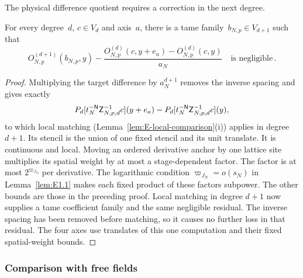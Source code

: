 The physical difference quotient requires a correction in the next degree.
\begin{lemma}\label{lem:E2.9}
For every degree~$d$, $c\in V_d$ and axis~$a$, there is a tame family~$b_{N,p}\in V_{d+1}$ such that
\begin{equation*}
O^{(d+1)}_{N,p}(b_{N,p},y)
-\frac{O^{(d)}_{N,p}(c,y+e_a)-O^{(d)}_{N,p}(c,y)}{a_N}
\quad\text{is negligible}\,.
\end{equation*}
\end{lemma}
\begin{proof}
Multiplying the target difference by $a_N^{d+1}$ removes the inverse spacing and gives exactly
\begin{equation*}
P_d[t_N^{-\mathsf{N}}\mathsf Z_{N,p,d}^{-1}c](y+e_a)
-P_d[t_N^{-\mathsf{N}}\mathsf Z_{N,p,d}^{-1}c](y),
\end{equation*}
to which local matching (Lemma~\ref{lem:E-local-comparison}(i)) applies in degree $d+1$. Its stencil is the union of one fixed stencil and its unit translate. It is continuous and local. Moving an ordered derivative anchor by one lattice site multiplies its spatial weight by at most a stage-dependent factor. The factor is at most $2^{\varpi_{J_N}}$ per derivative. The logarithmic condition $\varpi_{J_N}=o(s_N)$ in Lemma~\ref{lem:E1.1} makes each fixed product of these factors subpower. The other bounds are those in the preceding proof. Local matching in degree $d+1$ now supplies a tame coefficient family and the same negligible residual. The inverse spacing has been removed before matching, so it causes no further loss in that residual. The four axes use translates of this one computation and their fixed spatial-weight bounds.
\end{proof}

\subsubsection{Comparison with free fields}\label{sec:partII-E.2.5}


